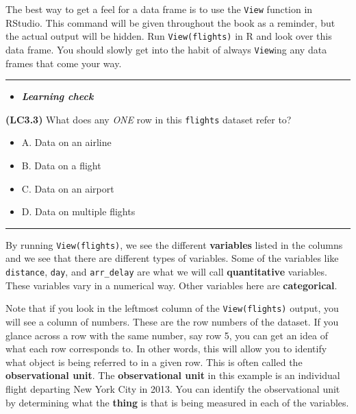 \documentclass[]{tufte-book}
\let\oldrule=\rule
\renewcommand{\rule}[1]{\oldrule{\linewidth}}
\providecommand{\tightlist}{%
  \setlength{\itemsep}{0pt}\setlength{\parskip}{0pt}}
\newenvironment{rmdblock}[1]
  {\begin{shaded*}
  \begin{itemize}
  \renewcommand{\labelitemi}{
    \raisebox{-.7\height}[0pt][0pt]{
    }
  }
  \item
  }
  {
  \end{itemize}
  \end{shaded*}
  }
\newenvironment{learncheck}
  {\begin{rmdblock}{warning}}
  {\end{rmdblock}}
\begin{document}
The best way to get a feel for a data frame is to use the \texttt{View}
function in RStudio. This command will be given throughout the book as a
reminder, but the actual output will be hidden. Run
\texttt{View(flights)} in R and look over this data frame. You should
slowly get into the habit of always \texttt{View}ing any data frames
that come your way.

\begin{center}\rule{0.5\linewidth}{\linethickness}\end{center}

\begin{learncheck}
\textbf{\emph{Learning check}}
\end{learncheck}

\textbf{(LC3.3)} What does any \emph{ONE} row in this \texttt{flights}
dataset refer to?

\begin{itemize}
\tightlist
\item
  A. Data on an airline
\item
  B. Data on a flight
\item
  C. Data on an airport
\item
  D. Data on multiple flights
\end{itemize}

\begin{center}\rule{0.5\linewidth}{\linethickness}\end{center}

By running \texttt{View(flights)}, we see the different
\textbf{variables} listed in the columns and we see that there are
different types of variables. Some of the variables like
\texttt{distance}, \texttt{day}, and \texttt{arr\_delay} are what we
will call \textbf{quantitative} variables. These variables vary in a
numerical way. Other variables here are \textbf{categorical}.

Note that if you look in the leftmost column of the
\texttt{View(flights)} output, you will see a column of numbers. These
are the row numbers of the dataset. If you glance across a row with the
same number, say row 5, you can get an idea of what each row corresponds
to. In other words, this will allow you to identify what object is being
referred to in a given row. This is often called the
\textbf{observational unit}. The \textbf{observational unit} in this
example is an individual flight departing New York City in 2013. You can
identify the observational unit by determining what the \textbf{thing}
is that is being measured in each of the variables.
\end{document}
